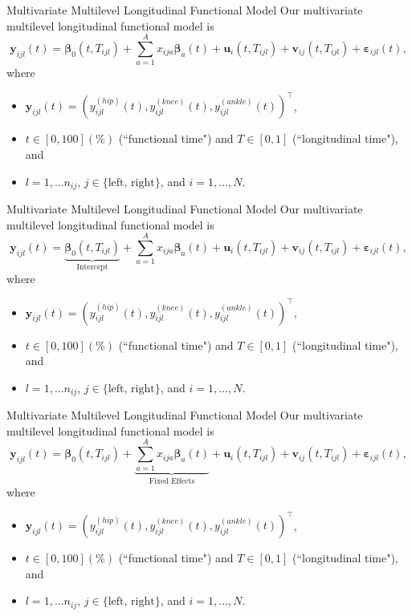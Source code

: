 \documentclass[aspectratio=128,xcolor=dvipsnames, notes]{beamer}
\newcommand{\1}{\mathbf{1}}
\newcommand{\boldbeta}{\boldsymbol{\beta}}
\newcommand{\boldy}{\mathbf{y}}
\begin{document}
\begin{frame}{Multivariate Multilevel Longitudinal Functional Model \parencite{gunning_multivariate_2023}}
Our multivariate multilevel longitudinal functional model is 
$$
\boldy_{ijl} (t) = \boldbeta_0(t, T_{ijl}) + \sum_{a=1}^A x_{ija} \boldbeta_{a} (t) + \mathbf{u}_{i} (t, T_{ijl}) + \mathbf{v}_{ij} (t, T_{ijl}) + \boldsymbol{\varepsilon}_{ijl} (t),
$$
where
\begin{itemize}
\small
    \pause \item $\boldy_{ijl} (t) = \left(y_{ijl}^{(hip)} (t), y_{ijl}^{(knee)} (t), y_{ijl}^{(ankle)} (t)\right)^\top$,
    \pause \item $t \in [0, 100](\%)$ (``functional time") and $T \in [0, 1]$ (``longitudinal time"), and
    \pause \item $l = 1, \dots n_{ij}$, $j \in \{\text{left, right}\}$, and $i = 1, \dots, N$.
\end{itemize}
\end{frame}

\begin{frame}[noframenumbering]{Multivariate Multilevel Longitudinal Functional Model \parencite{gunning_multivariate_2023}}
Our multivariate multilevel longitudinal functional model is 
$$
\boldy_{ijl} (t) = \underbrace{\boldbeta_0(t, T_{ijl})}_{\text{Intercept}} + \sum_{a=1}^A x_{ija} \boldbeta_{a} (t) + \mathbf{u}_{i} (t, T_{ijl}) + \mathbf{v}_{ij} (t, T_{ijl}) + \boldsymbol{\varepsilon}_{ijl} (t),
$$
where
\begin{itemize}
\small
    \item $\boldy_{ijl} (t) = \left(y_{ijl}^{(hip)} (t), y_{ijl}^{(knee)} (t), y_{ijl}^{(ankle)} (t)\right)^\top$,
    \item $t \in [0, 100](\%)$ (``functional time") and $T \in [0, 1]$ (``longitudinal time"), and
    \item $l = 1, \dots n_{ij}$, $j \in \{\text{left, right}\}$, and $i = 1, \dots, N$.
\end{itemize}
\end{frame}

\begin{frame}[noframenumbering]{Multivariate Multilevel Longitudinal Functional Model \parencite{gunning_multivariate_2023}}
Our multivariate multilevel longitudinal functional model is 
$$
\boldy_{ijl} (t) = \boldbeta_0(t, T_{ijl}) + \underbrace{\sum_{a=1}^A x_{ija} \boldbeta_{a} (t)}_{\text{Fixed Effects}} + \mathbf{u}_{i} (t, T_{ijl}) + \mathbf{v}_{ij} (t, T_{ijl}) + \boldsymbol{\varepsilon}_{ijl} (t),
$$
where
\begin{itemize}
\small
    \item $\boldy_{ijl} (t) = \left(y_{ijl}^{(hip)} (t), y_{ijl}^{(knee)} (t), y_{ijl}^{(ankle)} (t)\right)^\top$,
    \item $t \in [0, 100](\%)$ (``functional time") and $T \in [0, 1]$ (``longitudinal time"), and
    \item $l = 1, \dots n_{ij}$, $j \in \{\text{left, right}\}$, and $i = 1, \dots, N$.
\end{itemize}
\end{frame}
\end{document}
